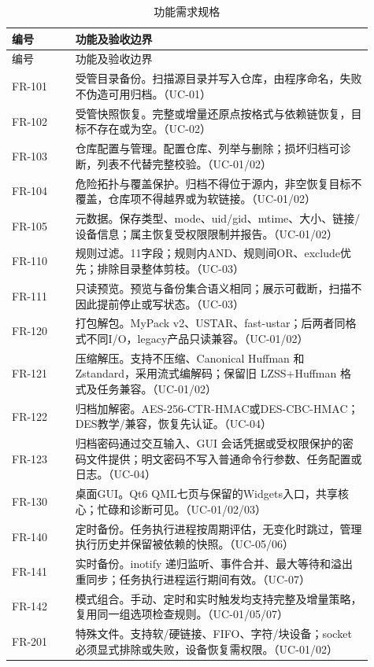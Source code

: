 \begin{longtable}{L{0.16\linewidth}L{0.75\linewidth}}
\caption{功能需求规格}\label{tab:functional}\\\toprule 编号 & 功能及验收边界\\\midrule\endfirsthead
\toprule 编号 & 功能及验收边界\\\midrule\endhead
FR-101 & 受管目录备份。扫描源目录并写入仓库，由程序命名，失败不伪造可用归档。（UC-01）\\
FR-102 & 受管快照恢复。完整或增量还原点按格式与依赖链恢复，目标不存在或为空。（UC-02）\\
FR-103 & 仓库配置与管理。配置仓库、列举与删除；损坏归档可诊断，列表不代替完整校验。（UC-01/02）\\
FR-104 & 危险拓扑与覆盖保护。归档不得位于源内，非空恢复目标不覆盖，仓库项不得越界或为软链接。（UC-01/02）\\
FR-105 & 元数据。保存类型、mode、uid/gid、mtime、大小、链接/设备信息；属主恢复受权限限制并报告。（UC-01/02）\\
FR-110 & 规则过滤。11字段；规则内AND、规则间OR、exclude优先；排除目录整体剪枝。（UC-03）\\
FR-111 & 只读预览。预览与备份集合语义相同；展示可截断，扫描不因此提前停止或写状态。（UC-03）\\
FR-120 & 打包解包。MyPack v2、USTAR、fast-ustar；后两者同格式不同I/O，legacy产品只读兼容。（UC-01/02）\\
FR-121 & 压缩解压。支持不压缩、Canonical Huffman 和 Zstandard，采用流式编解码；保留旧 LZSS+Huffman 格式及任务兼容。（UC-01/02）\\
FR-122 & 归档加解密。AES-256-CTR-HMAC或DES-CBC-HMAC；DES教学/兼容，恢复先认证。（UC-04）\\
FR-123 & 归档密码通过交互输入、GUI 会话凭据或受权限保护的密码文件提供；明文密码不写入普通命令行参数、任务配置或日志。（UC-04）\\
FR-130 & 桌面GUI。Qt6 QML七页与保留的Widgets入口，共享核心；忙碌和诊断可见。（UC-01/02/03）\\
FR-140 & 定时备份。任务执行进程按周期评估，无变化时跳过，管理执行历史并保留被依赖的快照。（UC-05/06）\\
FR-141 & 实时备份。inotify 递归监听、事件合并、最大等待和溢出重同步；任务执行进程运行期间有效。（UC-07）\\
FR-142 & 模式组合。手动、定时和实时触发均支持完整及增量策略，复用同一组选项检查规则。（UC-01/05/07）\\
FR-201 & 特殊文件。支持软/硬链接、FIFO、字符/块设备；socket必须显式排除或失败，设备恢复需权限。（UC-01/02）\\

\end{longtable}
